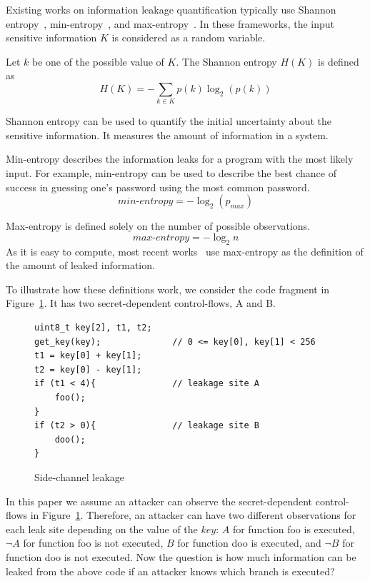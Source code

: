 Existing works on information leakage quantification typically use Shannon
entropy~\cite{clark2007static,Wichelmann:2018:MFF:3274694.3274741},
min-entropy~\cite{10.1007/978-3-642-00596-1_21}, and max-entropy~\cite{182946,
    Doychev:2017:RAS:3062341.3062388}. In these frameworks, the input sensitive
information $K$ is considered as a random variable.

Let $k$ be one of the possible
value of $K$. The Shannon entropy $H(K)$ is defined as
\begin{displaymath}
    H(K) = - \sum_{k {\in} K}p(k)\log_2(p(k))
\end{displaymath}

Shannon entropy can be used to quantify the initial uncertainty about the
sensitive information. It measures the amount of information in a system.

Min-entropy describes the information leaks for a program with the most likely input.
For example, min-entropy can be used to describe the
best chance of success in guessing one's password using the
most common password. %
\begin{displaymath}
    \mathit{min\text{-}entropy} = - \log_2(p_{\mathit{max}})
\end{displaymath}

Max-entropy is defined solely on the number of possible observations.
\begin{displaymath}
    \mathit{max\text{-}entropy} = -\log_2{n}
\end{displaymath}
As it is easy to compute, most recent works~\cite{182946,Doychev:2017:RAS:3062341.3062388} use max-entropy as the definition of
the amount of leaked information.

To illustrate how these definitions work, we consider the code
fragment in Figure~\ref{fig:side-channel}. It has two secret-dependent
control-flows, A and B.

\begin{figure}[h!]
    \centering
    \begin{lstlisting}[xleftmargin=.2\textwidth, xrightmargin=.2\textwidth]
uint8_t key[2], t1, t2;
get_key(key);              // 0 <= key[0], key[1] < 256
t1 = key[0] + key[1];
t2 = key[0] - key[1];
if (t1 < 4){               // leakage site A
    foo();    
}                          
if (t2 > 0){               // leakage site B     
    doo();    
}                          
\end{lstlisting}
    \vspace*{-1pt}
    \caption{Side-channel leakage}
    \label{fig:side-channel}
\end{figure}
In this paper we assume an attacker can observe the secret-dependent control-flows in Figure~\ref{fig:side-channel}.
Therefore, an attacker can have two different observations for each leak site
depending on the value of the $\mathit{key}$: $A$ for function \textsf{foo} is executed,
$\neg A$ for function \textsf{foo} is not executed, $B$ for function \textsf{doo} is
executed, and $\neg B$ for function \textsf{doo} is not executed. Now the
question is how much information can be leaked from the above code if an
attacker knows which branch is executed?


